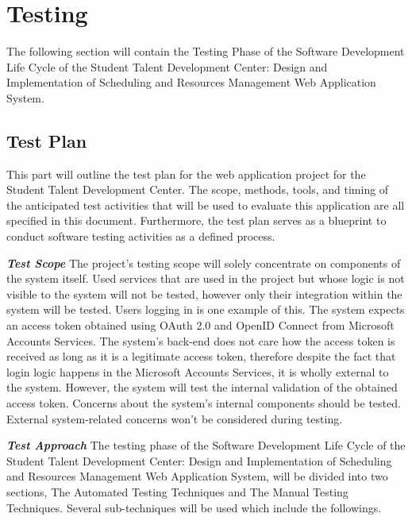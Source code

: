 \section{Testing}
\begin{justify}
    The following section will contain the Testing Phase of the Software Development Life Cycle of the Student Talent Development Center: Design and Implementation of Scheduling and Resources Management Web Application System.\\
\end{justify}

\subsection{Test Plan}
\begin{justify}
    This part will outline the test plan for the web application project for the Student Talent Development Center. The scope, methods, tools, and timing of the anticipated test activities that will be used to evaluate this application are all specified in this document.  Furthermore, the test plan serves as a blueprint to conduct software testing activities as a defined process.
    
    \vspace{0.25cm}
    \newendline \textbf{\textit{Test Scope}}\newendline
    The project's testing scope will solely concentrate on components of the system itself. Used services that are used in the project but whose logic is not visible to the system will not be tested, however only their integration within the system will be tested. Users logging in is one example of this. The system expects an access token obtained using OAuth 2.0 and OpenID Connect from Microsoft Accounts Services. The system's back-end does not care how the access token is received as long as it is a legitimate access token, therefore despite the fact that login logic happens in the Microsoft Accounts Services, it is wholly external to the system. However, the system will test the internal validation of the obtained access token. Concerns about the system's internal components should be tested. External system-related concerns won't be considered during testing.

    \vspace{0.25cm}
    \newendline \textbf{\textit{Test Approach}}\newendline
    The testing phase of the Software Development Life Cycle of the Student Talent Development Center: Design and Implementation of Scheduling and Resources Management Web Application System, will be divided into two sections, The Automated Testing Techniques and The Manual Testing Techniques. Several sub-techniques will be used which include the followings.


\end{justify}
